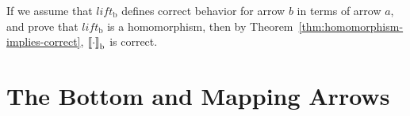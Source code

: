 \documentclass[preprint]{sigplanconf}
\newcommand{\arrowlift}{\ensuremath{lift}}
\newcommand{\genb}{_\mathrm{b}}
\begin{document}
If we assume that $\arrowlift\genb$ defines correct behavior for arrow $b$ in terms of arrow $a$, and prove that $\arrowlift\genb$ is a homomorphism, then by Theorem~\ref{thm:homomorphism-implies-correct}, $\meaningof{\cdot}\genb$ is correct.


\section{The Bottom and Mapping Arrows}
\end{document}
